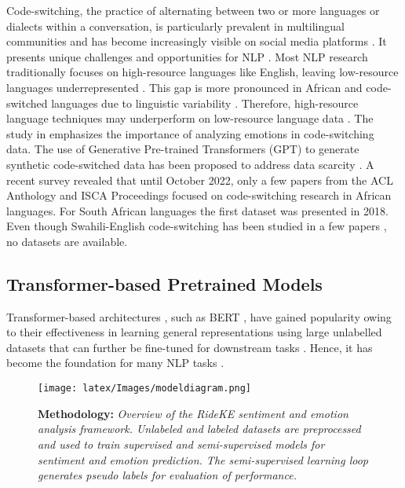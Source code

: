 Code-switching, the practice of alternating between two or more languages or dialects within a conversation, is particularly prevalent in multilingual communities and has become increasingly visible on social media platforms \cite{poplack2000toward,scotton1993social, danet2007multilingual}. It presents unique challenges and opportunities for NLP \cite{barman2014code}. Most NLP research traditionally focuses on high-resource languages like English, leaving low-resource languages underrepresented \cite{strassel2016lorelei, adelani2021masakhaner}. This gap is more pronounced in African and code-switched languages due to linguistic variability  \cite{adelani2021masakhaner}. Therefore, high-resource language techniques may underperform on low-resource language data \cite{lewis2014ethnologue}. The study in \cite{lee2015emotion} emphasizes the importance of analyzing emotions in code-switching data.  
The use of Generative Pre-trained Transformers (GPT) to generate synthetic code-switched data has been proposed to address data scarcity \cite{terblanche2024prompting}. A recent survey \cite{winata2022decades} revealed that until October 2022, only a few papers from the ACL Anthology and ISCA Proceedings focused on code-switching research in African languages. 
For South African languages \cite{niesler2018first, niesler2008accent} 
the first dataset was presented in 2018.
Even though Swahili-English code-switching has been studied in a few papers \cite{piergallini2016word, otundo2022intonation}, no datasets are available.

\subsection{ Transformer-based Pretrained Models}
Transformer-based architectures \cite{vaswani2017attention}, such as BERT  \cite{devlin2018bert}, have gained popularity owing to their effectiveness in learning general representations using large unlabelled datasets \cite{matthew2018peters} that can further be fine-tuned for downstream tasks \cite{gururangan2020don, bhattacharjee2020bert}. Hence, it has become the foundation for many NLP tasks \cite{bhattacharjee2020bert}.

\begin{figure}[ht!]
    \centering
    \texttt{[image: latex/Images/modeldiagram.png]}
    \caption{ \textbf{Methodology:} \textit{Overview of the RideKE sentiment and emotion analysis framework. Unlabeled and labeled datasets are preprocessed and used to train supervised and semi-supervised models for sentiment and emotion prediction. The semi-supervised learning loop generates pseudo labels for evaluation of performance.}}
    \label{fig:rideke}
\end{figure}

